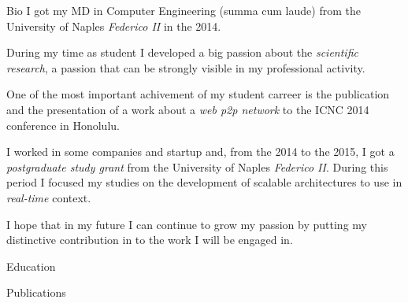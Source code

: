 \documentclass{cv}
\begin{document}
\begin{resume}

  \begin{cvsection}{\faCoffee}{Bio}
    I got my MD in Computer Engineering (summa cum laude) from the University of Naples \emph{Federico II} in the 2014.

    During my time as student I developed a big passion about the \emph{scientific research}, a passion that can be strongly visible in my professional activity.

    One of the most important achivement of my student carreer is the publication and the presentation of a work about a \emph{web p2p network} to the ICNC 2014 conference in Honolulu.

    I worked in some companies and startup and, from the 2014 to the 2015, I got a \emph{postgraduate study grant} from the University of Naples \emph{Federico II}. During this period I focused my studies on the development of scalable architectures to use in \emph{real-time} context.
    
    I hope that in my future I can continue to grow my passion by putting my distinctive contribution in to the work I will be engaged in.
  \end{cvsection}

  \begin{cvsection}{\faGraduationCap}{Education}
  \end{cvsection}

  \begin{cvsection}{\faBook}{Publications}
  \end{cvsection}


\end{resume}
\end{document}
